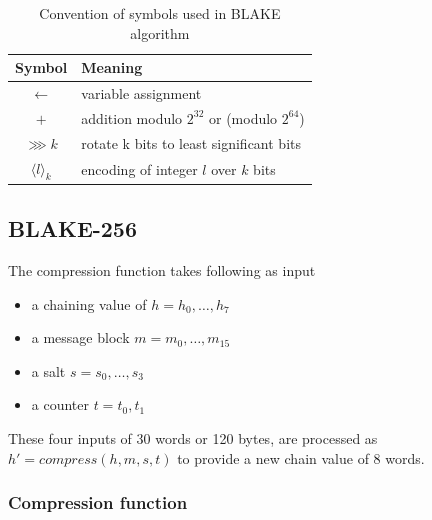 \begin{table}[h]
  \begin{center}
    \begin{tabular}{ c l } \hline
      Symbol                  & Meaning \\ \hline
      $\gets$                 & variable assignment \\
      $+$                     & addition modulo $2^{32}$ or (modulo $2^{64}$) \\
      $\ggg k$                & rotate k bits to least significant bits \\
      $\langle l \rangle_{k}$ & encoding of integer $l$ over $k$ bits \\ \hline
    \end{tabular}
    \caption{Convention of symbols used in BLAKE algorithm}
  \end{center}
\end{table}

\subsection{ BLAKE-256 }

The compression function takes following as input
\begin{itemize}
  \item a chaining value of $h = h_{0},\dots, h_{7}$
  \item a message block $m = m_{0},\dots, m_{15}$
  \item a salt $s = s_{0},\dots, s_{3}$
  \item a counter $t = t_{0}, t_{1}$
\end{itemize}
These four inputs of 30 words or 120 bytes, are processed as $h' = compress(h, m, s, t)$ to provide a new
chain value of 8 words.

  \subsubsection{Compression function}

